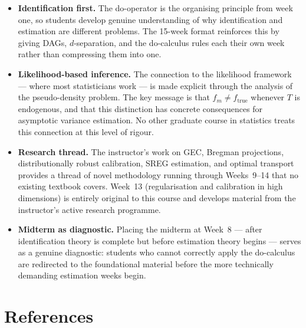 \documentclass[12pt]{article}
\begin{document}
\begin{itemize}
  \item \textbf{Identification first.}
    The do-operator is the organising principle from week one, so students
    develop genuine understanding of why identification and estimation are
    different problems.  The 15-week format reinforces this by giving
    DAGs, $d$-separation, and the do-calculus rules each their own week
    rather than compressing them into one.

  \item \textbf{Likelihood-based inference.}
    The connection to the likelihood framework --- where most statisticians
    work --- is made explicit through the analysis of the pseudo-density
    problem.  The key message is that $f_m \neq f_{\mathrm{true}}$ whenever
    $T$ is endogenous, and that this distinction has concrete consequences
    for asymptotic variance estimation.  No other graduate course in
    statistics treats this connection at this level of rigour.

  \item \textbf{Research thread.}
    The instructor's work on GEC, Bregman projections, distributionally
    robust calibration, SREG estimation, and optimal transport provides a
    thread of novel methodology running through Weeks~9--14 that no
    existing textbook covers.  Week~13 (regularisation and calibration
    in high dimensions) is entirely original to this course and develops
    material from the instructor's active research programme.

  \item \textbf{Midterm as diagnostic.}
    Placing the midterm at Week~8 --- after identification theory is
    complete but before estimation theory begins --- serves as a genuine
    diagnostic: students who cannot correctly apply the do-calculus are
    redirected to the foundational material before the more technically
    demanding estimation weeks begin.
\end{itemize}

\section*{References}
\end{document}
